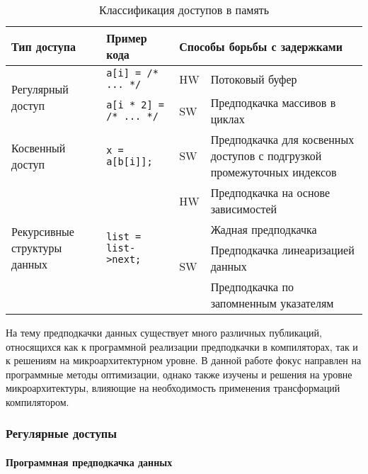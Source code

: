 \documentclass[12pt,a4paper]{article}
\begin{document}
\begin{table}[h]
  \begin{center}
    \begin{tabular}{|| m{4cm} | l | l | m{5.5cm} ||}
      \hline
      Тип доступа & Пример кода & \multicolumn{2}{|l|}{Способы борьбы с задержками} \\
      \hline\hline
      \multirow{2}{4cm}{Регулярный доступ} & \texttt{a[i] = /* ... */} & HW & Потоковый буфер \\ \cline{3-4}
                  &  \texttt{a[i * 2] = /* ... */} & SW & Предподкачка массивов в циклах \\
      \hline
      Косвенный доступ & \texttt{x = a[b[i]];} & SW & Предподкачка для косвенных доступов с подгрузкой промежуточных индексов \\
      \hline
      \multirow{4}{4cm}{Рекурсивные структуры данных} & \multirow{4}{*}{\texttt{list = list->next;}} & HW & Предподкачка на основе зависимостей \\ \cline{3-4}
                  & & \multirow{3}{*}{SW} & Жадная предподкачка \\
                  & & & Предподкачка линеаризацией данных \\
                  & & & Предподкачка по запомненным указателям \\
      \hline
    \end{tabular}
    \caption{Классификация доступов в память}
    \label{tab:classify}
  \end{center}
\end{table}

На тему предподкачки данных существует много различных публикаций, относящихся как к программной реализации предподкачки в компиляторах, так и к решениям на микроархитектурном уровне. В данной работе фокус направлен на программные методы оптимизации, однако также изучены и решения на уровне микроархитектуры, влияющие на необходимость применения трансформаций компилятором.

\subsubsection{Регулярные доступы}

\paragraph{Программная предподкачка данных}
\end{document}

